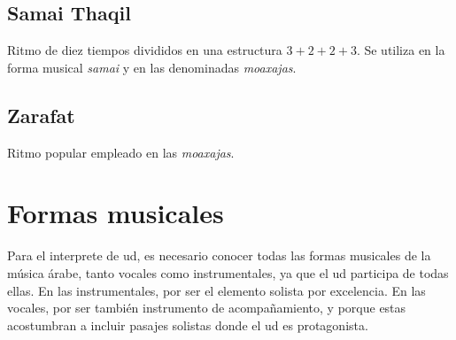 

\subsection{Samai Thaqil}

Ritmo de diez tiempos divididos en una estructura $3+2+2+3$. Se utiliza en la forma musical \emph{samai} y en las denominadas \emph{moaxajas}.

\begin{center}
\end{center}


\subsection{Zarafat}

Ritmo popular empleado en las \emph{moaxajas}.

\begin{center}
\end{center}


\section{Formas musicales}

    Para el interprete de ud, es necesario conocer todas las formas musicales de la música árabe, tanto vocales como instrumentales, ya que el ud participa de todas ellas. En las instrumentales, por ser el elemento solista por excelencia. En las vocales, por ser también instrumento de acompañamiento, y porque estas acostumbran a incluir pasajes solistas donde el ud es protagonista.

